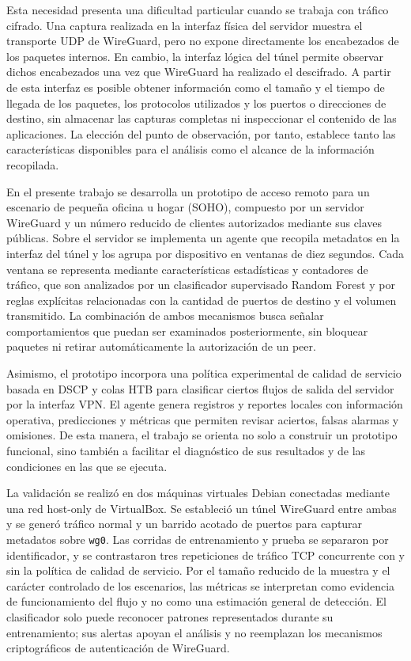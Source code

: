 \documentclass[conference]{IEEEtran}
\begin{document}
Esta necesidad presenta una dificultad particular cuando se trabaja con tráfico cifrado. Una captura realizada en la interfaz física del servidor muestra el transporte UDP de WireGuard, pero no expone directamente los encabezados de los paquetes internos. En cambio, la interfaz lógica del túnel permite observar dichos encabezados una vez que WireGuard ha realizado el descifrado. A partir de esta interfaz es posible obtener información como el tamaño y el tiempo de llegada de los paquetes, los protocolos utilizados y los puertos o direcciones de destino, sin almacenar las capturas completas ni inspeccionar el contenido de las aplicaciones. La elección del punto de observación, por tanto, establece tanto las características disponibles para el análisis como el alcance de la información recopilada.

En el presente trabajo se desarrolla un prototipo de acceso remoto para un escenario de pequeña oficina u hogar (SOHO), compuesto por un servidor WireGuard y un número reducido de clientes autorizados mediante sus claves públicas. Sobre el servidor se implementa un agente que recopila metadatos en la interfaz del túnel y los agrupa por dispositivo en ventanas de diez segundos. Cada ventana se representa mediante características estadísticas y contadores de tráfico, que son analizados por un clasificador supervisado Random Forest y por reglas explícitas relacionadas con la cantidad de puertos de destino y el volumen transmitido. La combinación de ambos mecanismos busca señalar comportamientos que puedan ser examinados posteriormente, sin bloquear paquetes ni retirar automáticamente la autorización de un peer.

Asimismo, el prototipo incorpora una política experimental de calidad de servicio basada en DSCP y colas HTB para clasificar ciertos flujos de salida del servidor por la interfaz VPN. El agente genera registros y reportes locales con información operativa, predicciones y métricas que permiten revisar aciertos, falsas alarmas y omisiones. De esta manera, el trabajo se orienta no solo a construir un prototipo funcional, sino también a facilitar el diagnóstico de sus resultados y de las condiciones en las que se ejecuta.

La validación se realizó en dos máquinas virtuales Debian conectadas mediante una red host-only de VirtualBox. Se estableció un túnel WireGuard entre ambas y se generó tráfico normal y un barrido acotado de puertos para capturar metadatos sobre \texttt{wg0}. Las corridas de entrenamiento y prueba se separaron por identificador, y se contrastaron tres repeticiones de tráfico TCP concurrente con y sin la política de calidad de servicio. Por el tamaño reducido de la muestra y el carácter controlado de los escenarios, las métricas se interpretan como evidencia de funcionamiento del flujo y no como una estimación general de detección. El clasificador solo puede reconocer patrones representados durante su entrenamiento; sus alertas apoyan el análisis y no reemplazan los mecanismos criptográficos de autenticación de WireGuard.
\end{document}
